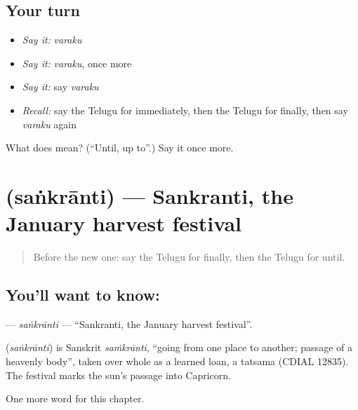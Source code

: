 \subsection*{Your turn}
\begin{itemize}
\raggedright
  \item \emph{Say it:} \emph{varaku}
  \item \emph{Say it:} \emph{varaku}, once more
  \item \emph{Say it:} say \emph{varaku}
  \item \emph{Recall:} say the Telugu for immediately, then the Telugu for finally, then say \emph{varaku} again
\end{itemize}

\begin{tcolorbox}[breakable,colback=teal!4,colframe=teal!35!black,title={Before you move on}]
What does  mean? (\textquotedblleft{}Until, up to\textquotedblright{}.) Say it once more.
\end{tcolorbox}
\section[\texorpdfstring{\te{సంక్రాంతి} (saṅkrānti)}{సంక్రాంతి (saṅkrānti)}]{ (saṅkrānti) — Sankranti, the January harvest festival}

\label{lesson:TE-C212-sankranti}



\begin{quote}
Before the new one: say the Telugu for finally, then the Telugu for until.
\end{quote}

\subsection*{You'll want to know: }
\textbf{} — \emph{saṅkrānti} — \textquotedblleft{}Sankranti, the January harvest festival\textquotedblright{}.

\begin{cousinweb}
\textbf{} (\emph{saṅkrānti}) is Sanskrit \emph{saṁkrānti}, \textquotedblleft{}going from one place to another; passage of a heavenly body\textquotedblright{}, taken over whole as a learned loan, a tatsama (CDIAL 12835). The festival marks the sun's passage into Capricorn.
\end{cousinweb}

\begin{grammarlens}[title={What you've built}]
One more word for this chapter.
\end{grammarlens}

